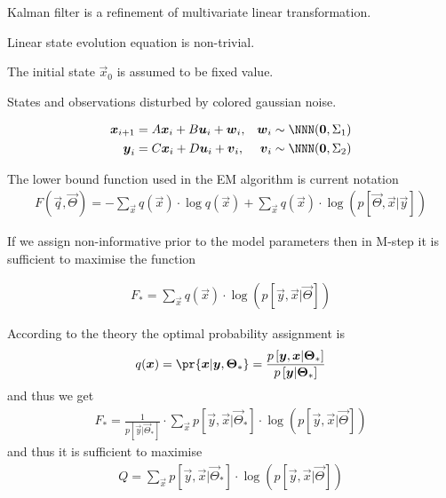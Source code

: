 \documentclass[landscape,footrule]{foils}
\newcommand{\pd}[1]{p\left[#1\right]}
\begin{document}
Kalman filter is a refinement of multivariate linear transformation.
\begin{triangles}
\item Linear state evolution equation is non-trivial.
\item The initial state $\vec{x}_0$ is assumed to be fixed value.
\item States and observations disturbed by colored gaussian noise. 
\end{triangles}
\begin{align*}
\vec{x}_{i+1}&=A\vec{x}_{i}+B\vec{u}_{i}+\vec{w}_{i}, &\vec{w}_{i}&\sim \NNN(\vec{0}, \Sigma_1)\\
\vec{y}_i&=C\vec{x}_i+D\vec{u}_i+\vec{v}_i, &\vec{v}_{i}&\sim \NNN(\vec{0}, \Sigma_2)
\end{align*}




The lower bound function used in the EM algorithm is current notation
\begin{align*}
F(\vec{q},\vec{\Theta})= -\sum_{\vec{x}}q(\vec{x})\cdot\log q(\vec{x})+
 \sum_{\vec{x}}q(\vec{x})\cdot\log\left(\pd{\vec{\Theta},\vec{x}|\vec{y}}\right)
\end{align*}

If we assign non-informative prior to the model parameters then in M-step it is sufficient to maximise the function

\begin{align*}
F_*=\sum_{\vec{x}}q(\vec{x})\cdot\log\left(\pd{\vec{y},\vec{x}|\vec{\Theta}}\right)
\end{align*}  


According to the theory the optimal probability assignment is
\begin{align*}
q(\vec{x})=\pr{\vec{x}|\vec{y},\vec{\Theta}_*}=\frac{\pd{\vec{y},\vec{x}|\vec{\Theta}_*}}{\pd{\vec{y}|\vec{\Theta}_*}}
\end{align*}
and thus we get
\begin{align*}
F_*=\frac{1}{\pd{\vec{y}|\vec{\Theta}_*}}\cdot\sum_{\vec{x}}\pd{\vec{y},\vec{x}|\vec{\Theta}_*}\cdot\log\left(\pd{\vec{y},\vec{x}|\vec{\Theta}}\right)
\end{align*}  
and thus it is sufficient to maximise
\begin{align*}
Q=\sum_{\vec{x}}\pd{\vec{y},\vec{x}|\vec{\Theta}_*}\cdot\log\left(\pd{\vec{y},\vec{x}|\vec{\Theta}}\right)
\end{align*}
\end{document}
